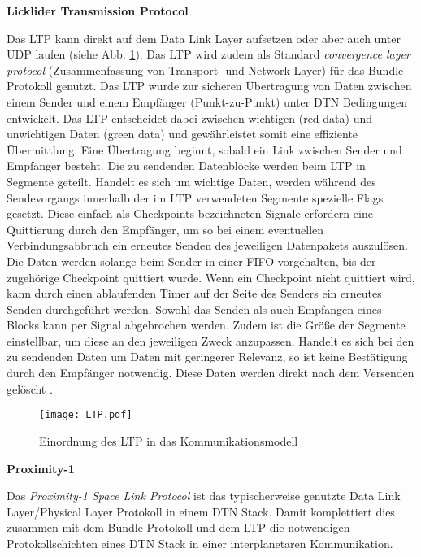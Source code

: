 \textbf{Licklider Transmission Protocol}

Das \gls{LTP} kann direkt auf dem Data Link Layer
aufsetzen oder aber auch unter \gls{UDP} laufen (siehe Abb. \ref{fig:LTP}). Das \gls{LTP}
wird zudem als Standard \textit{convergence layer protocol} (Zusammenfassung von
Transport- und Network-Layer) f{\"u}r das Bundle Protokoll genutzt. Das \gls{LTP}
wurde zur sicheren {\"U}bertragung von Daten zwischen einem Sender und einem
Empf{\"a}nger (Punkt-zu-Punkt) unter \gls{DTN} Bedingungen entwickelt. Das \gls{LTP}
entscheidet dabei zwischen wichtigen (red data) und unwichtigen Daten (green
data) und gew{\"a}hrleistet somit eine effiziente {\"U}bermittlung. Eine
{\"U}bertragung beginnt, sobald ein Link zwischen Sender und Empf{\"a}nger
besteht. Die zu sendenden Datenbl{\"o}cke werden beim \gls{LTP} in Segmente geteilt.
Handelt es sich um wichtige Daten, werden w{\"a}hrend des Sendevorgangs
innerhalb der im \gls{LTP} verwendeten Segmente spezielle Flags gesetzt.
Diese einfach als Checkpoints bezeichneten Signale erfordern eine Quittierung
durch den Empf{\"a}nger, um so bei einem eventuellen Verbindungsabbruch ein
erneutes Senden des jeweiligen Datenpakets auszul{\"o}sen. Die Daten werden
solange beim Sender in einer \gls{FIFO} vorgehalten, bis der zugeh{\"o}rige
Checkpoint quittiert wurde. Wenn ein Checkpoint nicht quittiert wird, kann durch
einen ablaufenden Timer auf der Seite des Senders ein erneutes Senden
durchgeführt werden. Sowohl das Senden als auch Empfangen eines Blocks kann per
Signal abgebrochen werden. Zudem ist die Gr{\"o}{\ss}e der Segmente einstellbar,
um diese an den jeweiligen Zweck anzupassen. Handelt es sich bei den zu sendenden
Daten um Daten mit geringerer Relevanz, so ist keine Best{\"a}tigung durch den
Empf{\"a}nger notwendig.
Diese Daten werden direkt nach dem Versenden gel{\"o}scht \cite{web4}.

\begin{figure}[H]
\centering
\texttt{[image: LTP.pdf]}
\caption{Einordnung des LTP in das Kommunikationsmodell}
\label{fig:LTP}
\end{figure}

\textbf{Proximity-1}

Das \textit{Proximity-1 Space Link Protocol} ist das typischerweise genutzte
Data Link Layer/Physical Layer Protokoll in einem \gls{DTN} Stack. Damit komplettiert
dies zusammen mit dem Bundle Protokoll und dem \gls{LTP} die notwendigen
Protokollschichten eines \gls{DTN} Stack in einer interplanetaren Kommunikation.

